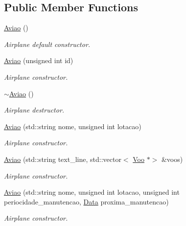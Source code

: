 \subsection*{Public Member Functions}
\begin{DoxyCompactItemize}
\item 
\mbox{\label{class_aviao_aa43143b3f27fc8e27156b4289250dc9f}} 
\hyperlink{class_aviao_aa43143b3f27fc8e27156b4289250dc9f}{Aviao} ()
\begin{DoxyCompactList}\small\item\em Airplane default constructor. \end{DoxyCompactList}\item 
\hyperlink{class_aviao_a7d27ed74a1f0393f02cc470b53e193d5}{Aviao} (unsigned int id)
\begin{DoxyCompactList}\small\item\em Airplane constructor. \end{DoxyCompactList}\item 
\hyperlink{class_aviao_a04157e09c8c20e6596cea3abbd57d415}{$\sim$\+Aviao} ()
\begin{DoxyCompactList}\small\item\em Airplane destructor. \end{DoxyCompactList}\item 
\hyperlink{class_aviao_a17c48595d427e93b351556d8cec01423}{Aviao} (std\+::string nome, unsigned int lotacao)
\begin{DoxyCompactList}\small\item\em Airplane constructor. \end{DoxyCompactList}\item 
\hyperlink{class_aviao_ace2bc92f2db79df73da0d48f3edd39bb}{Aviao} (std\+::string text\+\_\+line, std\+::vector$<$ \hyperlink{class_voo}{Voo} $\ast$$>$ \&voos)
\begin{DoxyCompactList}\small\item\em Airplane constructor. \end{DoxyCompactList}\item 
\hyperlink{class_aviao_ad9a01dede3dd1274a63686529d44a4b7}{Aviao} (std\+::string nome, unsigned int lotacao, unsigned int periocidade\+\_\+manutencao, \hyperlink{class_data}{Data} proxima\+\_\+manutencao)
\begin{DoxyCompactList}\small\item\em Airplane constructor. \end{DoxyCompactList}\item 
$$
\end{DoxyCompactItemize}
